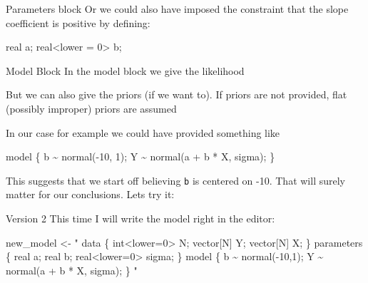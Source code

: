 \documentclass[
  11pt,
  ignorenonframetext,
]{beamer}
\newenvironment{Shaded}{\begin{snugshade}}{\end{snugshade}}
\newcommand{\DecValTok}[1]{\textcolor[rgb]{0.68,0.00,0.00}{#1}}
\newcommand{\FunctionTok}[1]{\textcolor[rgb]{0.28,0.35,0.67}{#1}}
\newcommand{\NormalTok}[1]{\textcolor[rgb]{0.00,0.23,0.31}{#1}}
\newcommand{\OtherTok}[1]{\textcolor[rgb]{0.00,0.23,0.31}{#1}}
\newcommand{\SpecialCharTok}[1]{\textcolor[rgb]{0.37,0.37,0.37}{#1}}
\newcommand{\StringTok}[1]{\textcolor[rgb]{0.13,0.47,0.30}{#1}}
\begin{document}
\begin{frame}[fragile]{Parameters block}
\protect\hypertarget{parameters-block-5}{}
Or we could also have imposed the constraint that the slope coefficient
is positive by defining:

\begin{Shaded}
\begin{Highlighting}[]
\NormalTok{real a;}
\NormalTok{real}\SpecialCharTok{\textless{}}\NormalTok{lower }\OtherTok{=} \DecValTok{0}\SpecialCharTok{\textgreater{}}\NormalTok{ b;}
\end{Highlighting}
\end{Shaded}
\end{frame}

\begin{frame}[fragile]{Model Block}
\protect\hypertarget{model-block-1}{}
In the model block we give the likelihood

But we can also give the priors (if we want to). If priors are not
provided, flat (possibly improper) priors are assumed

In our case for example we could have provided something like

\begin{Shaded}
\begin{Highlighting}[]
\NormalTok{model \{}
\NormalTok{  b }\SpecialCharTok{\textasciitilde{}} \FunctionTok{normal}\NormalTok{(}\SpecialCharTok{{-}}\DecValTok{10}\NormalTok{, }\DecValTok{1}\NormalTok{);}
\NormalTok{  Y }\SpecialCharTok{\textasciitilde{}} \FunctionTok{normal}\NormalTok{(a }\SpecialCharTok{+}\NormalTok{ b }\SpecialCharTok{*}\NormalTok{ X, sigma);}
\NormalTok{\}}
\end{Highlighting}
\end{Shaded}

This suggests that we start off believing \texttt{b} is centered on -10.
That will surely matter for our conclusions. Lets try it:
\end{frame}

\begin{frame}[fragile]{Version 2}
\protect\hypertarget{version-2-1}{}
This time I will write the model right in the editor:

\begin{Shaded}
\begin{Highlighting}[]
\NormalTok{new\_model }\OtherTok{\textless{}{-}} \StringTok{"}
\StringTok{data \{}
\StringTok{  int\textless{}lower=0\textgreater{} N;}
\StringTok{  vector[N] Y;}
\StringTok{  vector[N] X;}
\StringTok{\}}
\StringTok{parameters \{}
\StringTok{  real a;}
\StringTok{  real b;}
\StringTok{  real\textless{}lower=0\textgreater{} sigma;}
\StringTok{\}}
\StringTok{model \{}
\StringTok{  b \textasciitilde{} normal({-}10,1);}
\StringTok{  Y \textasciitilde{} normal(a + b * X, sigma);}
\StringTok{\}}
\StringTok{"}
\end{Highlighting}
\end{Shaded}
\end{frame}
\end{document}
